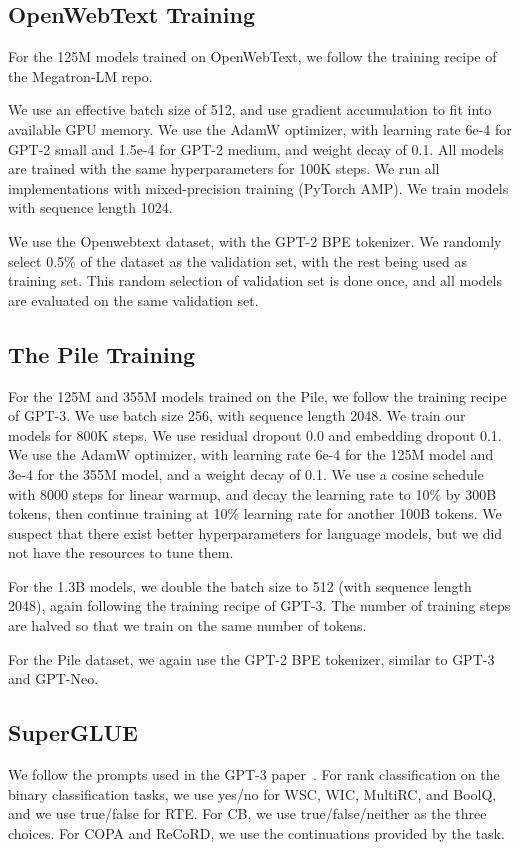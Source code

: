 \subsection{OpenWebText Training}
For the 125M models trained on OpenWebText, we follow the training recipe of the Megatron-LM repo.

We use an effective batch size of 512, and use gradient accumulation to fit into
available GPU memory.
We use the AdamW optimizer, with learning rate 6e-4 for GPT-2 small and 1.5e-4
for GPT-2 medium, and weight decay of 0.1.
All models are trained with the same hyperparameters for 100K steps.
We run all implementations with mixed-precision training (PyTorch AMP).
We train models with sequence length 1024.

We use the Openwebtext dataset, with the GPT-2 BPE tokenizer. We randomly select
0.5\% of the dataset as the validation set, with the rest being used as training
set.
This random selection of validation set is done once, and all models are evaluated
on the same validation set.

\subsection{The Pile Training}
For the 125M and 355M models trained on the Pile, we follow the training recipe of GPT-3.
We use batch size 256, with sequence length 2048.
We train our models for 800K steps.
We use residual dropout 0.0 and embedding dropout 0.1.
We use the AdamW optimizer, with learning rate 6e-4 for the 125M model and 3e-4 for the 355M model, and a weight decay of 0.1.
We use a cosine schedule with 8000 steps for linear warmup, and decay the
learning rate to 10\% by 300B tokens, then continue training at 10\% learning
rate for another 100B tokens.
We suspect that there exist better hyperparameters for \hthree language models, but we did not have the resources to tune them.

For the 1.3B models, we double the batch size to 512 (with sequence length
2048), again following the training recipe of GPT-3. The number of training
steps are halved so that we train on the same number of tokens.

For the Pile dataset, we again use the GPT-2 BPE tokenizer, similar to GPT-3 and GPT-Neo.

\subsection{SuperGLUE}
We follow the prompts used in the GPT-3 paper~\citep{brown2020language}.
For rank classification on the binary classification tasks, we use yes/no for WSC, WIC, MultiRC, and BoolQ, and we use true/false for RTE.
For CB, we use true/false/neither as the three choices.
For COPA and ReCoRD, we use the continuations provided by the task.

